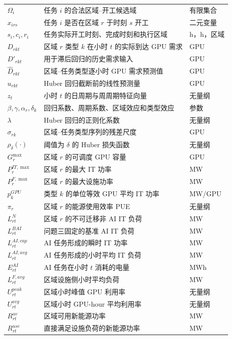 {\begin{longtable}{lll}
$\Omega_i$ & 任务 $i$ 的合法区域--开工候选域 & 有限集合 \\
$x_{irs}$ & 任务 $i$ 是否在区域 $r$ 于时刻 $s$ 开工 & 二元变量 \\
$s_i,c_i,r_i$ & 任务实际开工时刻、完成时刻和执行区域 & h，h，区域 \\
$D_{rkt}$ & 区域 $r$ 类型 $k$ 在小时 $t$ 的实际到达 GPU 需求 & GPU \\
$D'_{rkt}$ & 用于滞后回归的历史需求输入 & GPU \\
$\widehat D_{rkt}$ & 区域--任务类型逐小时 GPU 需求预测值 & GPU \\
$u_{rkt}$ & Huber 回归截断前的线性预测量 & GPU \\
$z_t$ & 小时 $t$ 的日周期与周周期特征向量 & 无量纲 \\
$\beta,\gamma,\alpha_r,\delta_k$ & 回归系数、周期系数、区域效应和类型效应 & 参数 \\
$\lambda$ & Huber 回归的正则化系数 & 无量纲 \\
$\sigma_{rk}$ & 区域--任务类型序列的残差尺度 & GPU \\
$\rho_{\delta}(\cdot)$ & 阈值为 $\delta$ 的 Huber 损失函数 & 无量纲 \\
$G_r^{\max}$ & 区域 $r$ 的可调度 GPU 容量 & GPU \\
$P_r^{IT,\max}$ & 区域 $r$ 的最大 IT 功率 & MW \\
$P_r^{F,\max}$ & 区域 $r$ 的最大设施功率 & MW \\
$p_k^{GPU}$ & 类型 $k$ 的单位等效 GPU 平均 IT 功率 & MW/GPU \\
$\pi_r$ & 区域 $r$ 的能源使用效率 PUE & 无量纲 \\
$L_{rt}^{N}$ & 区域 $r$ 的不可迁移非 AI IT 负荷 & MW \\
$L_{rt}^{BAI}$ & 问题三固定的基准 AI IT 负荷 & MW \\
$L_{rt}^{AI,cap}$ & AI 任务形成的瞬时 IT 功率 & MW \\
$L_{rt}^{AI,avg}$ & AI 任务形成的小时平均 IT 负荷 & MW \\
$E_{rt}^{AI}$ & AI 任务在小时 $t$ 消耗的电量 & MWh \\
$L_{rt}^{F,avg}$ & 区域设施侧小时平均负荷 & MW \\
$U_{rt}^{peak}$ & 区域小时峰值 GPU 利用率 & 无量纲 \\
$U_{rt}^{avg}$ & 区域小时 GPU-hour 平均利用率 & 无量纲 \\
$R_{rt}^{av}$ & 区域可用新能源功率 & MW \\
$R_{rt}^{use}$ & 直接满足设施负荷的新能源功率 & MW \\

\end{longtable}}
